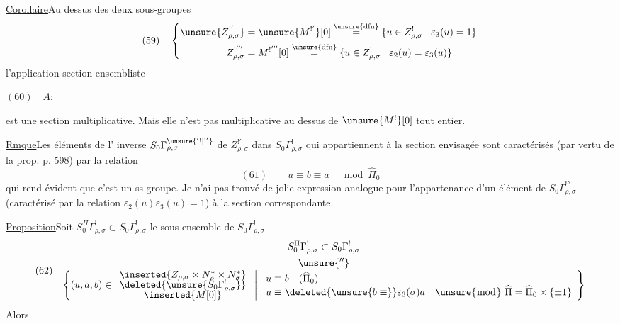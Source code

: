 \uline{Corollaire}\quad Au dessus des deux sous-groupes
\[
(59)\quad\left\{\begin{aligned}
\unsure{Z_{\rho,\sigma}^{!'}}&=\unsure{M^{!'}}[0]
\overset{\unsure{\mathrm{dfn}}}{=}
\{u\in Z_{\rho,\sigma}^{!}\mid\varepsilon_3(u)=1\}\\
Z_{\rho,\sigma}^{!'''}&=M^{!'''}[0]
\overset{\unsure{\mathrm{dfn}}}{=}
\{u\in Z_{\rho,\sigma}^{!}\mid\varepsilon_2(u)=\varepsilon_3(u)\}
\end{aligned}\right.
\]
l'application section ensembliste

$(60)\quad A:$

est une section multiplicative. Mais elle n'est pas multiplicative au
dessus de $\unsure{M^{!}}[0]$ tout entier.

\uline{Rmque}\quad Les éléments de l' inverse
$S_0\Gamma_{\rho,\sigma}^{\unsure{'!|!'}}$ de $Z_{\rho,\sigma}^{!'}$
dans $S_0\Gamma_{\rho,\sigma}^{!}$ qui appartiennent à la section envisagée
sont caractérisés (par vertu de la prop. p. 598) par la relation
\[
(61)\qquad u\equiv b\equiv a\quad\bmod\widehat\Pi_0
\]
qui rend évident que c'est un ss-groupe.
Je n'ai pas trouvé de jolie expression analogue pour l'appartenance d'un
élément de $S_0\Gamma_{\rho,\sigma}^{!''}$
(caractérisé par la relation $\varepsilon_2(u)\varepsilon_3(u)=1$)
à la section correspondante.

\uline{Proposition}\quad Soit
$S_0^\Pi\Gamma_{\rho,\sigma}^{!}\subset S_0\Gamma_{\rho,\sigma}^{!}$
le sous-ensemble de $S_0\Gamma_{\rho,\sigma}^{!}$
\[
(62)\quad
\begin{gathered}
S_0^\Pi\Gamma_{\rho,\sigma}^{!}\subset S_0\Gamma_{\rho,\sigma}^{!}\\
\unsure{''}\\[-1ex]
\left\{(u,a,b)\in
\begin{array}{c}
\inserted{Z_{\rho,\sigma}\times N_\rho^*\times N_\sigma^*}\\[-.5ex]
\deleted{\unsure{S_0\Gamma_{\rho,\sigma}^{!}}}\\[-.5ex]
\inserted{M[0]}
\end{array}
\ \middle|\ 
\begin{array}{l}
u\equiv b\quad(\widehat\Pi_0)\\
u\equiv\deleted{\unsure{b\equiv}}\varepsilon_3(\sigma)a\quad
\unsure{\bmod}\ \widehat\Pi=\widehat\Pi_0\times\{\pm1\}
\end{array}
\right\}
\end{gathered}
\]
Alors

